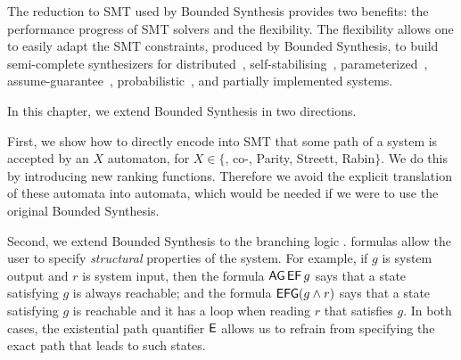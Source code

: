 The reduction to SMT used by Bounded Synthesis provides two benefits:
the performance progress of SMT solvers and the flexibility.
The flexibility allows one to easily adapt the SMT constraints,
produced by Bounded Synthesis,
to build semi-complete synthesizers for
distributed~\cite{BS},
self-stabilising~\cite{Nico},
parameterized~\cite{JB12},
assume-guarantee~\cite{Bloem2015},
probabilistic~\cite{bounded-pctl},
and partially implemented systems.

In this chapter, we extend Bounded Synthesis in two directions.

First,
we show how to directly encode into SMT that some path of a system
is accepted by an $X$ automaton, for $X \in \{$\buchi, co-\buchi,
Parity, Streett, Rabin$\}$.
We do this by introducing new ranking functions.
Therefore we avoid the explicit translation of these automata into \buchi automata,
which would be needed if we were to use the original Bounded Synthesis.

Second, we extend Bounded Synthesis to the branching logic \CTLstar.
\CTLstar formulas allow the user to specify \emph{structural} properties of the system.
For example,
if $g$ is system output and $r$ is system input,
then the \CTLstar formula $\operatorname{\mathsf{AG}}\operatorname{\mathsf{EF}} g$ says that
a state satisfying $g$ is always reachable;
and the \CTLstar formula $\operatorname{\mathsf{EFG}}(g \land r)$ says that
a state satisfying $g$ is reachable and it has a loop when reading $r$ that satisfies $g$.
In both cases, the existential path quantifier ${\operatorname{\mathsf{E}}}$ allows us to refrain
from specifying the exact path that leads to such states.

